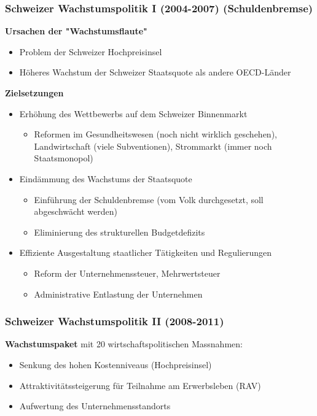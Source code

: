 \subsubsection{Schweizer Wachstumspolitik I (2004-2007) (Schuldenbremse)}
\textbf{Ursachen der "Wachstumsflaute"}
\begin{itemize}
	\item Problem der Schweizer Hochpreisinsel
	\item Höheres Wachstum der Schweizer Staatsquote als andere OECD-Länder
\end{itemize}
\textbf{Zielsetzungen}
\begin{itemize}
	\item Erhöhung des Wettbewerbs auf dem Schweizer Binnenmarkt
	\begin{itemize}
		\item Reformen im Gesundheitswesen (noch nicht wirklich geschehen), Landwirtschaft (viele Subventionen), Strommarkt (immer noch Staatsmonopol)
	\end{itemize}
	\item Eindämmung des Wachstums der Staatsquote
	\begin{itemize}
		\item Einführung der Schuldenbremse (vom Volk durchgesetzt, soll abgeschwächt werden)
		\item Eliminierung des strukturellen Budgetdefizits
	\end{itemize}
	\item Effiziente Ausgestaltung staatlicher Tätigkeiten und Regulierungen
	\begin{itemize}
		\item Reform der Unternehmenssteuer, Mehrwertsteuer
		\item Administrative Entlastung der Unternehmen
	\end{itemize}
\end{itemize}

\subsubsection{Schweizer Wachstumspolitik II (2008-2011)}
\textbf{Wachstumspaket} mit 20 wirtschaftspolitischen Massnahmen:
\begin{itemize}
	\item Senkung des hohen Kostenniveaus (Hochpreisinsel)
	\item Attraktivitätssteigerung für Teilnahme am Erwerbsleben (RAV)
	\item Aufwertung des Unternehmensstandorts
\end{itemize}

